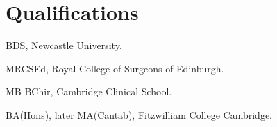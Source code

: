 \section*{Qualifications}

 BDS, Newcastle University.

 MRCSEd, Royal College of Surgeons of Edinburgh.

 MB BChir, Cambridge Clinical School.

 BA(Hons), later MA(Cantab), Fitzwilliam College Cambridge.
